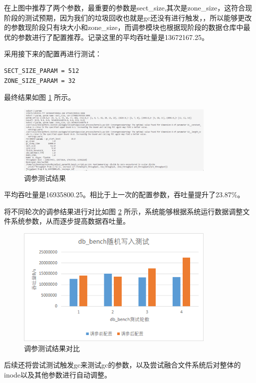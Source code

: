 在上图中推荐了两个参数，最重要的参数是sect\_size,其次是zone\_size，这符合现阶段的测试预期，因为我们的垃圾回收也就是gc还没有进行触发，，所以能够更改的参数现阶段只有块大小和zone\_size，而调参模块也根据现阶段的数据仓库中最优的参数进行了配置推荐。记录这里的平均吞吐量是13672167.25。

采用接下来的配置再进行测试：

\begin{lstlisting}
SECT_SIZE_PARAM = 512
ZONE_SIZE_PARAM = 32
\end{lstlisting}

最终结果如图 \ref{test-turnner3} 所示。

\begin{figure}[htbp]
  \centering
  \includegraphics[width=0.85\textwidth]{fig/turnner3}
  \caption{ 调参测试结果 }
  \label{test-turnner3}
\end{figure}

平均吞吐量是16935800.25。相比于上一次的配置参数，吞吐量提升了23.87\%。

将不同轮次的调参结果进行对比如图 \ref{test-turnner} 所示，系统能够根据系统运行数据调整文件系统参数，从而逐步提高数据吞吐量。

\begin{figure}[htbp]
  \centering
  \includegraphics[width=0.85\textwidth]{fig/test-turnner}
  \caption{ 调参测试结果对比 }
  \label{test-turnner}
\end{figure}

后续还将尝试测试触发gc来测试gc的参数，以及尝试融合文件系统后对整体的inode以及其他参数进行自动调整。

